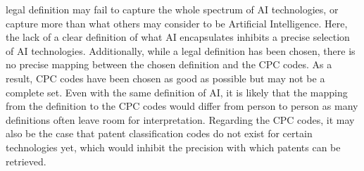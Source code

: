 \documentclass[
  12pt,
  a4paperpaper,
]{article}
\begin{document}
legal definition may fail to capture the whole spectrum of AI
technologies, or capture more than what others may consider to be
Artificial Intelligence. Here, the lack of a clear definition of what AI
encapsulates inhibits a precise selection of AI technologies.
Additionally, while a legal definition has been chosen, there is no
precise mapping between the chosen definition and the CPC codes. As a
result, CPC codes have been chosen as good as possible but may not be a
complete set. Even with the same definition of AI, it is likely that the
mapping from the definition to the CPC codes would differ from person to
person as many definitions often leave room for interpretation.
Regarding the CPC codes, it may also be the case that patent
classification codes do not exist for certain technologies yet, which
would inhibit the precision with which patents can be retrieved.
\end{document}
